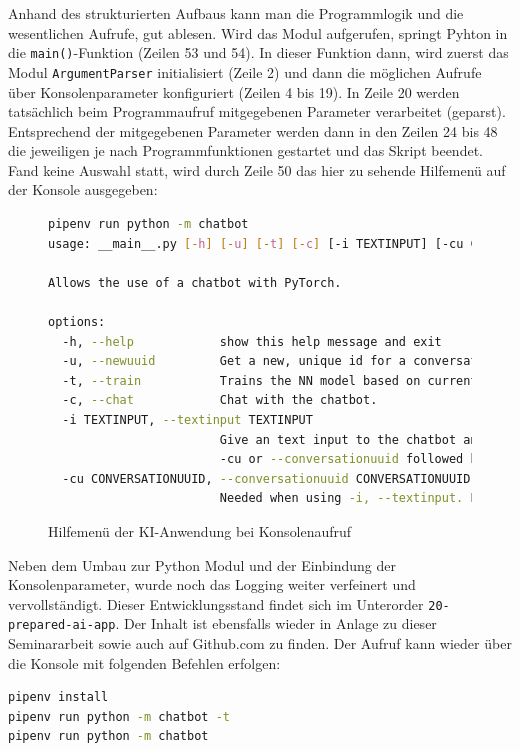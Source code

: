 \documentclass[12pt,oneside,titlepage,listof=totoc,bibliography=totoc]{scrartcl}
\newcommand{\code}[1]{\colorbox{code-gray}{\texttt{#1}}}
\begin{document}
Anhand des strukturierten Aufbaus kann man die Programmlogik und die wesentlichen Aufrufe, gut ablesen. Wird das Modul aufgerufen, springt Pyhton in die \code{main()}-Funktion (Zeilen 53 und 54). In dieser Funktion dann, wird zuerst das Modul \code{ArgumentParser} initialisiert (Zeile 2) und dann die möglichen Aufrufe über Konsolenparameter konfiguriert (Zeilen 4 bis 19). In Zeile 20 werden tatsächlich beim Programmaufruf mitgegebenen Parameter verarbeitet (geparst). Entsprechend der mitgegebenen Parameter werden dann in den Zeilen 24 bis 48 die jeweiligen je nach Programmfunktionen gestartet und das Skript beendet. Fand keine Auswahl statt, wird durch Zeile 50 das hier zu sehende Hilfemenü auf der Konsole ausgegeben:

\begin{figure}[H]
	\caption{Hilfemenü der KI-Anwendung bei Konsolenaufruf}
	\label{fig:code-help-para}
\begin{lstlisting}[language=bash]
pipenv run python -m chatbot       
usage: __main__.py [-h] [-u] [-t] [-c] [-i TEXTINPUT] [-cu CONVERSATIONUUID]

Allows the use of a chatbot with PyTorch.

options:
  -h, --help            show this help message and exit
  -u, --newuuid         Get a new, unique id for a conversation.
  -t, --train           Trains the NN model based on current data.
  -c, --chat            Chat with the chatbot.
  -i TEXTINPUT, --textinput TEXTINPUT
                        Give an text input to the chatbot and recive a answer. Provide a UUID for the conversation with  
                        -cu or --conversationuuid followed by the UUID.
  -cu CONVERSATIONUUID, --conversationuuid CONVERSATIONUUID
                        Needed when using -i, --textinput. Provide a UUID to a conversation.
\end{lstlisting} \end{figure}

Neben dem Umbau zur Python Modul und der Einbindung der Konsolenparameter, wurde noch das Logging weiter verfeinert und vervollständigt. Dieser Entwicklungsstand findet sich im Unterorder \code{20-prepared-ai-app}. Der Inhalt ist ebensfalls wieder in Anlage zu dieser Seminararbeit sowie auch auf Github.com zu finden. Der Aufruf kann wieder über die Konsole mit folgenden Befehlen erfolgen: 

\begin{lstlisting}[language=bash]
pipenv install
pipenv run python -m chatbot -t
pipenv run python -m chatbot
\end{lstlisting}
\end{document}
